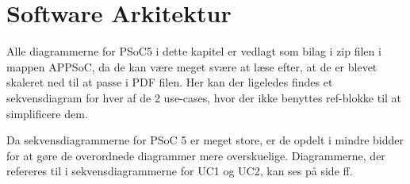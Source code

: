 \chapter{Software Arkitektur}



Alle diagrammerne for PSoC5 i dette kapitel er vedlagt som bilag i zip filen i mappen APPSoC, da de kan være meget svære at læse efter, at de er blevet skaleret ned til at passe i PDF filen. Her kan der ligeledes findes et sekvensdiagram for hver af de 2 use-cases, hvor der ikke benyttes ref-blokke til at simplificere dem.

Da sekvensdiagrammerne for PSoC 5 er meget store, er de opdelt i mindre bidder for at gøre de overordnede diagrammer mere overskuelige. Diagrammerne, der refereres til i sekvensdiagrammerne for UC1 og UC2, kan ses på side \pageref{SD:PSoC:findEdge} ff.








